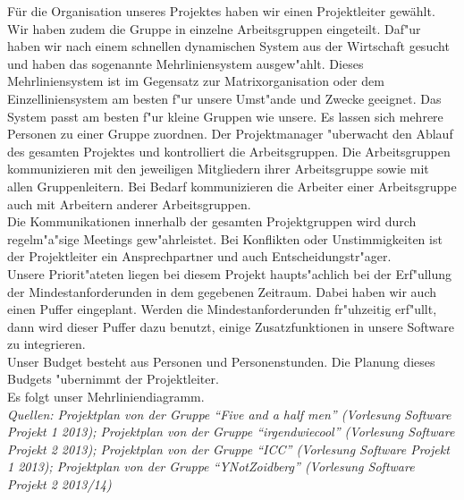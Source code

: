 \documentclass[fontsize=12pt,paper=a4,twoside]{scrartcl}
\begin{document}
Für die Organisation unseres Projektes haben wir einen Projektleiter gewählt.\\
Wir haben zudem die Gruppe in einzelne Arbeitsgruppen eingeteilt. Daf"ur haben wir nach einem schnellen dynamischen System aus der Wirtschaft gesucht und haben das sogenannte Mehrliniensystem ausgew"ahlt. Dieses Mehrliniensystem ist im Gegensatz zur Matrixorganisation oder dem Einzelliniensystem am besten f"ur unsere Umst"ande und Zwecke geeignet. Das System passt am besten f"ur kleine Gruppen wie unsere. Es lassen sich mehrere Personen zu einer Gruppe zuordnen. \newline
Der Projektmanager "uberwacht den Ablauf des gesamten Projektes und kontrolliert die Arbeitsgruppen. Die Arbeitsgruppen kommunizieren mit den jeweiligen Mitgliedern ihrer Arbeitsgruppe sowie mit allen Gruppenleitern. Bei Bedarf kommunizieren die Arbeiter einer Arbeitsgruppe auch mit Arbeitern anderer Arbeitsgruppen. \\
Die Kommunikationen innerhalb der gesamten Projektgruppen wird durch regelm"a"sige Meetings gew"ahrleistet. Bei Konflikten oder Unstimmigkeiten ist der Projektleiter ein Ansprechpartner und auch Entscheidungstr"ager.\\
Unsere Priorit"ateten liegen bei diesem Projekt haupts"achlich bei der Erf"ullung der Mindestanforderunden in dem gegebenen Zeitraum. Dabei haben wir auch einen Puffer eingeplant. Werden die Mindestanforderunden fr"uhzeitig erf"ullt, dann wird dieser Puffer dazu benutzt, einige Zusatzfunktionen in unsere Software zu integrieren. \\
Unser Budget besteht aus Personen und Personenstunden. Die Planung dieses Budgets "ubernimmt der Projektleiter.\\
Es folgt unser Mehrliniendiagramm.\\
\textit{Quellen: Projektplan von der Gruppe ``Five and a half men'' (Vorlesung Software Projekt 1 2013); Projektplan von der Gruppe ``irgendwiecool'' (Vorlesung Software Projekt 2 2013); Projektplan von der Gruppe ``ICC'' (Vorlesung Software Projekt 1 2013);  Projektplan von der Gruppe ``YNotZoidberg'' (Vorlesung Software Projekt 2 2013/14)}
\newpage
\end{document}

